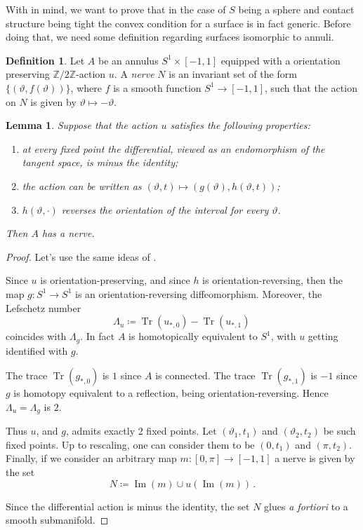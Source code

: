 \documentclass[a4paper, 11pt]{amsart}
\theoremstyle{plain}
\newtheorem{lemma}[lemma]{Lemma}
\theoremstyle{definition}
\newtheorem{defin}[defin]{Definition}
\newcommand{\Z}{\mathbb{Z}}
\renewcommand{\theta}{\vartheta}
\DeclareMathOperator{\Imm}{Im}
\DeclareMathOperator{\Tr}{Tr}
\begin{document}
With  in mind, we want to prove that in the case of $S$ being a sphere and contact structure being tight the convex condition for a surface is in fact generic. Before doing that, we need some definition regarding surfaces isomorphic to annuli.
\begin{defin}
	Let $A$ be an annulus $S^1 \times [-1,1]$ equipped with a orientation preserving $\Z/2\Z$-action $u$. A \emph{nerve} $N$ is an invariant set of the form $\{(\theta, f(\theta))\}$, where $f$ is a smooth function $S^1 \to [-1,1]$, such that the action on $N$ is given by $\theta \mapsto -\theta$.
\end{defin}
\begin{lemma}\label{nerve}
	Suppose that the action $u$ satisfies the following properties:
	\begin{enumerate}
		\item at every fixed point the differential, viewed as an endomorphism of the tangent space, is minus the identity;
		\item the action can be written as $(\theta,t) \mapsto (g(\theta), h(\theta,t))$;
		\item $h(\theta,\cdot)$ reverses the orientation of the interval for every $\theta$.
	\end{enumerate}
	Then $A$ has a nerve.
\end{lemma}
\begin{proof}
	Let's use the same ideas of .
	
	Since $u$ is orientation-preserving, and since $h$ is orientation-reversing, then the map $g \colon S^1 \to S^1$ is an orientation-reversing diffeomorphism. Moreover, the Lefschetz number
	\[
		\Lambda_u \coloneqq \Tr(u_{*,0})- \Tr(u_{*,1})\,
	\]
	coincides with $\Lambda_g$. In fact $A$ is homotopically equivalent to $S^1$, with $u$ getting identified with $g$. 
	
	The trace $\Tr(g_{*,0})$ is $1$ since $A$ is connected. The trace $\Tr(g_{*,1})$ is $-1$ since $g$ is homotopy equivalent to a reflection, being orientation-reversing. Hence $\Lambda_u = \Lambda_g$ is $2$.
	
	Thus $u$, and $g$, admits exactly 2 fixed points. Let $(\theta_1, t_1)$ and $(\theta_2, t_2)$ be such fixed points. Up to rescaling, one can consider them to be $(0,t_1)$ and $(\pi,t_2)$. Finally, if we consider an arbitrary map $m \colon [0,\pi] \to [-1,1]$ a nerve is given by the set
	\[
		N \coloneqq \Imm(m) \cup u(\Imm(m))\,. 
	\]
	
	Since the differential action is minus the identity, the set $N$ glues \emph{a fortiori} to a smooth submanifold.
\end{proof}
\end{document}
